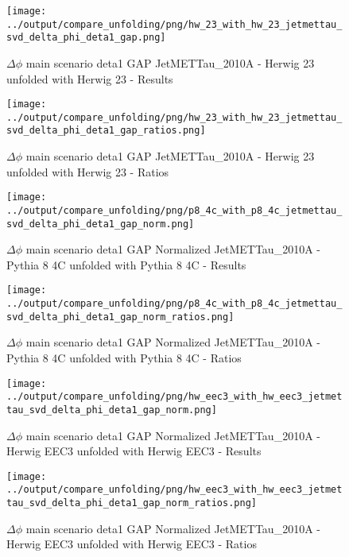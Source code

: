 \documentclass[11pt]{book}
\begin{document}
\begin{figure}[ht]
\centering
\texttt{[image: ../output/compare\_unfolding/png/hw\_23\_with\_hw\_23\_jetmettau\_svd\_delta\_phi\_deta1\_gap.png]}
\caption{$\Delta\phi$ main scenario deta1 GAP JetMETTau\_2010A - Herwig 23 unfolded with Herwig 23 - Results}
\label{hw_23_hw_23_jetmettau_svd_delta_phi_deta1_gap_a}
\end{figure}

\begin{figure}[ht]
\centering
\texttt{[image: ../output/compare\_unfolding/png/hw\_23\_with\_hw\_23\_jetmettau\_svd\_delta\_phi\_deta1\_gap\_ratios.png]}
\caption{$\Delta\phi$ main scenario deta1 GAP JetMETTau\_2010A - Herwig 23 unfolded with Herwig 23 - Ratios}
\label{hw_23_hw_23_jetmettau_svd_delta_phi_deta1_gap_b}
\end{figure}


\begin{figure}[ht]
\centering
\texttt{[image: ../output/compare\_unfolding/png/p8\_4c\_with\_p8\_4c\_jetmettau\_svd\_delta\_phi\_deta1\_gap\_norm.png]}
\caption{$\Delta\phi$ main scenario deta1 GAP Normalized JetMETTau\_2010A - Pythia 8 4C unfolded with Pythia 8 4C - Results}
\label{p8_p8_jetmettau_svd_delta_phi_deta1_gap_norm_a}
\end{figure}

\begin{figure}[ht]
\centering
\texttt{[image: ../output/compare\_unfolding/png/p8\_4c\_with\_p8\_4c\_jetmettau\_svd\_delta\_phi\_deta1\_gap\_norm\_ratios.png]}
\caption{$\Delta\phi$ main scenario deta1 GAP Normalized JetMETTau\_2010A - Pythia 8 4C unfolded with Pythia 8 4C - Ratios}
\label{p8_p8_jetmettau_svd_delta_phi_deta1_gap_norm_b}
\end{figure}

\begin{figure}[ht]
\centering
\texttt{[image: ../output/compare\_unfolding/png/hw\_eec3\_with\_hw\_eec3\_jetmettau\_svd\_delta\_phi\_deta1\_gap\_norm.png]}
\caption{$\Delta\phi$ main scenario deta1 GAP Normalized JetMETTau\_2010A - Herwig EEC3 unfolded with Herwig EEC3 - Results}
\label{hw_eec3_hw_eec3_jetmettau_svd_delta_phi_deta1_gap_norm_a}
\end{figure}

\begin{figure}[ht]
\centering
\texttt{[image: ../output/compare\_unfolding/png/hw\_eec3\_with\_hw\_eec3\_jetmettau\_svd\_delta\_phi\_deta1\_gap\_norm\_ratios.png]}
\caption{$\Delta\phi$ main scenario deta1 GAP Normalized JetMETTau\_2010A - Herwig EEC3 unfolded with Herwig EEC3 - Ratios}
\label{hw_eec3_hw_eec3_jetmettau_svd_delta_phi_deta1_gap_norm_b}
\end{figure}
\end{document}
